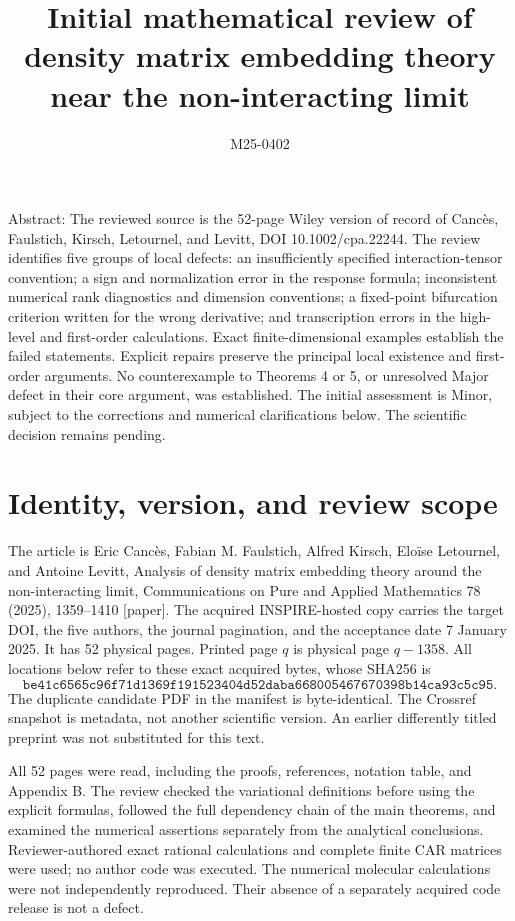 \documentclass[10pt]{article}
\title{Initial mathematical review of density matrix
embedding theory near the non-interacting limit}
\author{M25-0402}
\date{}
\begin{document}
\maketitle
Abstract: The reviewed source is the 52-page Wiley version of record of Cancès, Faulstich, Kirsch, Letournel, and Levitt, DOI 10.1002/cpa.22244. The review identifies five groups of local defects: an insufficiently specified interaction-tensor convention; a sign and normalization error in the response formula; inconsistent numerical rank diagnostics and dimension conventions; a fixed-point bifurcation criterion written for the wrong derivative; and transcription errors in the high-level and first-order calculations. Exact finite-dimensional examples establish the failed statements. Explicit repairs preserve the principal local existence and first-order arguments. No counterexample to Theorems 4 or 5, or unresolved Major defect in their core argument, was established. The initial assessment is Minor, subject to the corrections and numerical clarifications below. The scientific decision remains pending.\par
\section*{Identity, version, and review scope}
The article is Eric Cancès, Fabian M. Faulstich, Alfred Kirsch, Eloïse Letournel, and Antoine Levitt, Analysis of density matrix embedding theory around the non-interacting limit, Communications on Pure and Applied Mathematics 78 (2025), 1359–1410 [paper]. The acquired INSPIRE-hosted copy carries the target DOI, the five authors, the journal pagination, and the acceptance date 7 January 2025. It has 52 physical pages. Printed page \(q\) is physical page \(q-1358\). All locations below refer to these exact acquired bytes, whose SHA256 is \[\texttt{be41c6565c96f71d1369f191523404d52daba668005467670398b14ca93c5c95}.\] The duplicate candidate PDF in the manifest is byte-identical. The Crossref snapshot is metadata, not another scientific version. An earlier differently titled preprint was not substituted for this text.\par
All 52 pages were read, including the proofs, references, notation table, and Appendix B. The review checked the variational definitions before using the explicit formulas, followed the full dependency chain of the main theorems, and examined the numerical assertions separately from the analytical conclusions. Reviewer-authored exact rational calculations and complete finite CAR matrices were used; no author code was executed. The numerical molecular calculations were not independently reproduced. Their absence of a separately acquired code release is not a defect.\par
\end{document}
